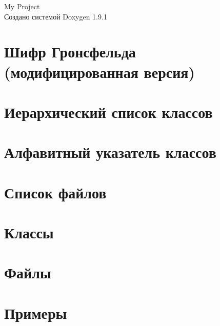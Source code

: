 \let\mypdfximage\pdfximage\def\pdfximage{\immediate\mypdfximage}\documentclass[twoside]{book}
\newcommand{\+}{\discretionary{\mbox{\scriptsize$\hookleftarrow$}}{}{}}
\newcommand{\clearemptydoublepage}{%
  \newpage{\pagestyle{empty}\cleardoublepage}%
}
\begin{document}
\raggedbottom

\hypersetup{pageanchor=false,
             bookmarksnumbered=true,
             pdfencoding=unicode
            }
\begin{titlepage}
\vspace*{7cm}
\begin{center}%
{\Large My Project }\\
\vspace*{1cm}
{\large Создано системой Doxygen 1.9.1}\\
\end{center}
\end{titlepage}
\clearemptydoublepage
{}
\tableofcontents
\clearemptydoublepage
{}
\hypersetup{pageanchor=true}

\chapter{Шифр Гронсфельда (модифицированная версия)}
\label{index}\hypertarget{index}{}
\chapter{Иерархический список классов}

\chapter{Алфавитный указатель классов}

\chapter{Список файлов}

\chapter{Классы}


\chapter{Файлы}

\chapter{Примеры}


\backmatter
\newpage
{}
\clearemptydoublepage
{}
\printindex
\end{document}
